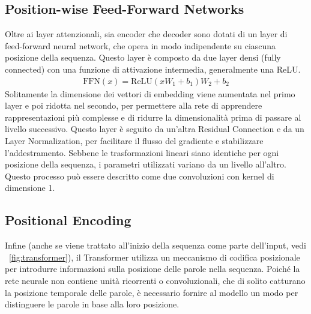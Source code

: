 \subsection{Position-wise Feed-Forward Networks}
Oltre ai layer attenzionali, sia encoder che decoder sono dotati di un layer di feed-forward neural network, che opera in modo indipendente su ciascuna posizione della sequenza. Questo layer è composto da due layer densi (fully connected) con una funzione di attivazione intermedia, generalmente una ReLU.
\begin{align*}
	\text{FFN}(x) = \text{ReLU}(xW_1 + b_1)W_2 + b_2
\end{align*}
Solitamente la dimensione dei vettori di embedding viene aumentata nel primo layer e poi ridotta nel secondo, per permettere alla rete di apprendere rappresentazioni più complesse e di ridurre la dimensionalità prima di passare al livello successivo. Questo layer è seguito da un'altra Residual Connection e da un Layer Normalization, per facilitare il flusso del gradiente e stabilizzare l'addestramento.
Sebbene le trasformazioni lineari siano identiche per ogni posizione della sequenza, i parametri utilizzati variano da un livello all'altro. Questo processo può essere descritto come due convoluzioni con kernel di dimensione 1.

\subsection{Positional Encoding}
\label{sec:positional-encoding}
Infine (anche se viene trattato all'inizio della sequenza come parte dell'input, vedi \figurename{~\ref{fig:transformer}}), il Transformer utilizza un meccanismo di codifica posizionale per introdurre informazioni sulla posizione delle parole nella sequenza. Poiché la rete neurale non contiene unità ricorrenti o convoluzionali, che di solito catturano la posizione temporale delle parole, è necessario fornire al modello un modo per distinguere le parole in base alla loro posizione.

